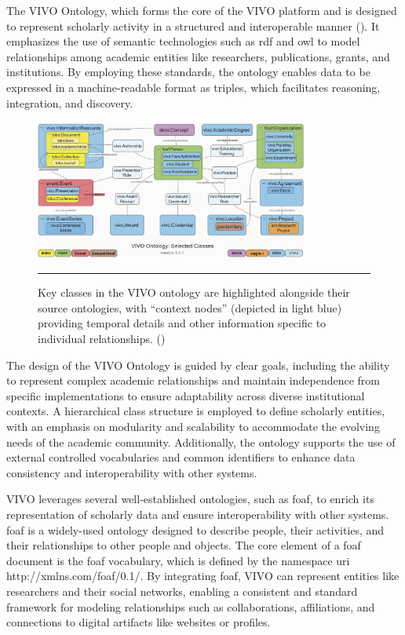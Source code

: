 The VIVO Ontology, which forms the core of the VIVO platform and is designed to represent scholarly activity in a structured and interoperable manner (\cite{VIVO}).
It emphasizes the use of semantic technologies such as \gls{rdf} and \gls{owl} to model relationships among academic entities like researchers, publications, grants, and institutions.
By employing these standards, the ontology enables data to be expressed in a machine-readable format as triples, which facilitates reasoning, integration, and discovery.

\begin{figure}[htbp]
    \centering
 \includegraphics[width=0.8\textwidth]{03_Figures/literature-review/vivo-ontology.png}
     \rule{35em}{0.5pt}
    \caption{Key classes in the VIVO ontology are highlighted alongside their source ontologies, with ``context nodes'' (depicted in light blue) providing temporal details and other information specific to individual relationships. (\cite{VIVO})}
 \label{fig:vivo-ontology}
\end{figure}

The design of the VIVO Ontology is guided by clear goals, including the ability to represent complex academic relationships and maintain independence from specific implementations to ensure adaptability across diverse institutional contexts.
A hierarchical class structure is employed to define scholarly entities, with an emphasis on modularity and scalability to accommodate the evolving needs of the academic community.
Additionally, the ontology supports the use of external controlled vocabularies and common identifiers to enhance data consistency and interoperability with other systems.

VIVO leverages several well-established ontologies, such as \gls{foaf}, to enrich its representation of scholarly data and ensure interoperability with other systems.
\gls{foaf} is a widely-used ontology designed to describe people, their activities, and their relationships to other people and objects.
The core element of a \gls{foaf} document is the \gls{foaf} vocabulary, which is defined by the namespace \gls{uri} http://xmlns.com/foaf/0.1/.
By integrating \gls{foaf}, VIVO can represent entities like researchers and their social networks, enabling a consistent and standard framework for modeling relationships such as collaborations, affiliations, and connections to digital artifacts like websites or profiles.

